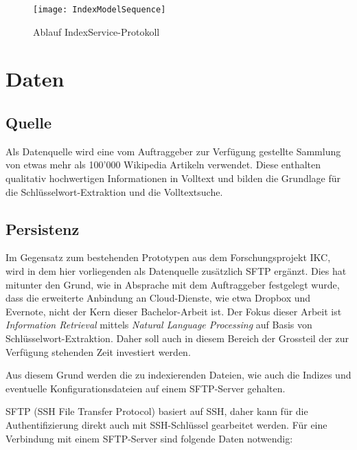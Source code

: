     \begin{figure}[H]
    \centering
    \texttt{[image: IndexModelSequence]}
    \caption{Ablauf IndexService-Protokoll}
    \label{fig:seqindexprotocol}
    \end{figure}


\section{Daten}
    
\subsection{Quelle}

Als Datenquelle wird eine vom Auftraggeber zur Verfügung gestellte Sammlung von etwas mehr als 100'000 Wikipedia Artikeln verwendet. Diese enthalten qualitativ hochwertigen Informationen in Volltext und bilden die Grundlage für die Schlüsselwort-Extraktion und die Volltextsuche.

\subsection{Persistenz}

Im Gegensatz zum bestehenden Prototypen aus dem Forschungsprojekt \gls{IKC}, wird in dem hier vorliegenden als Datenquelle zusätzlich \gls{SFTP} ergänzt. Dies hat mitunter den Grund, wie in Absprache mit dem Auftraggeber festgelegt wurde, dass die erweiterte Anbindung an Cloud-Dienste, wie etwa Dropbox und Evernote, nicht der Kern dieser Bachelor-Arbeit ist. Der Fokus dieser Arbeit ist \textit{Information Retrieval} mittels \textit{Natural Language Processing} auf Basis von Schlüsselwort-Extraktion. Daher soll auch in diesem Bereich der Grossteil der zur Verfügung stehenden Zeit investiert werden. 

Aus diesem Grund werden die zu indexierenden Dateien, wie auch die Indizes und eventuelle Konfigurationsdateien auf einem \gls{SFTP}-Server gehalten.

\gls{SFTP} (SSH File Transfer Protocol) basiert auf \gls{SSH}, daher kann für die Authentifizierung direkt auch mit \gls{SSH}-Schlüssel gearbeitet werden. Für eine Verbindung mit einem \gls{SFTP}-Server sind folgende Daten notwendig:



